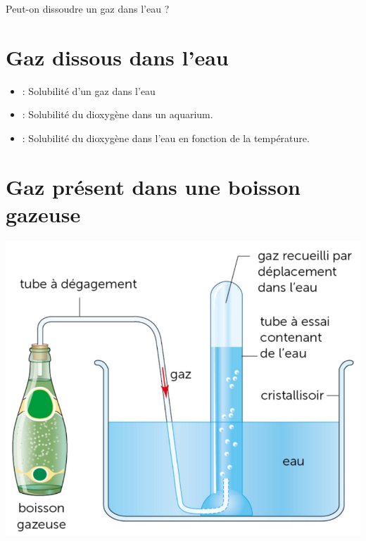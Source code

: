 \documentclass[12pt,a4paper]{article}
\date{}
\title{}
\begin{document}
	
\graphicspath{{./img/}}	



\begin{mypb}
	\begin{center}
		{\Large Peut-on dissoudre un gaz dans l'eau ?}
	\end{center}
\end{mypb}


\section{Gaz dissous dans l'eau}







\begin{myexos}
	\begin{itemize}
		\item {} : Solubilité d'un gaz dans l'eau
		\item {} : Solubilité du dioxygène dans un aquarium.
		\item {} : Solubilité du dioxygène dans l'eau en fonction de la température.
	\end{itemize}
\end{myexos}

\section{Gaz présent dans une boisson gazeuse}






	\begin{center}
		\includegraphics[scale=0.5]{recueil}
	\end{center}
\end{document}

